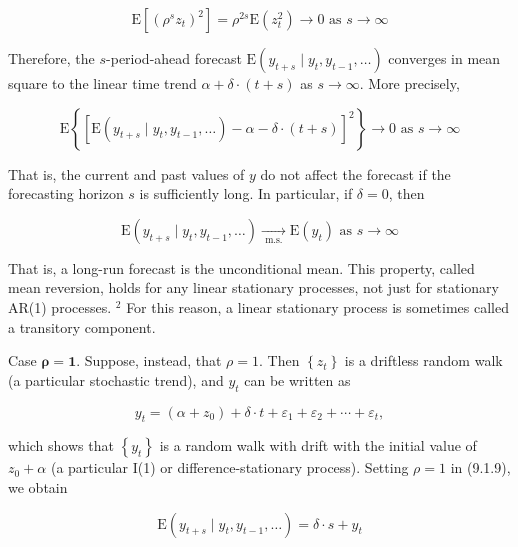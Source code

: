 \documentclass[10pt]{article}
\begin{document}
$$
\mathrm{E}\left[\left(\rho^{s} z_{t}\right)^{2}\right]=\rho^{2 s} \mathrm{E}\left(z_{t}^{2}\right) \rightarrow 0 \text { as } s \rightarrow \infty
$$

Therefore, the $s$-period-ahead forecast $\mathrm{E}\left(y_{t+s} \mid y_{t}, y_{t-1}, \ldots\right)$ converges in mean square to the linear time trend $\alpha+\delta \cdot(t+s)$ as $s \rightarrow \infty$. More precisely,


\begin{equation*}
\mathrm{E}\left\{\left[\mathrm{E}\left(y_{t+s} \mid y_{t}, y_{t-1}, \ldots\right)-\alpha-\delta \cdot(t+s)\right]^{2}\right\} \rightarrow 0 \text { as } s \rightarrow \infty \tag{9.1.10}
\end{equation*}


That is, the current and past values of $y$ do not affect the forecast if the forecasting horizon $s$ is sufficiently long. In particular, if $\delta=0$, then


\begin{equation*}
\mathrm{E}\left(y_{t+s} \mid y_{t}, y_{t-1}, \ldots\right) \underset{\text { m.s. }}{\rightarrow} \mathrm{E}\left(y_{t}\right) \text { as } s \rightarrow \infty \tag{9.1.11}
\end{equation*}


That is, a long-run forecast is the unconditional mean. This property, called mean reversion, holds for any linear stationary processes, not just for stationary AR(1) processes. ${ }^{2}$ For this reason, a linear stationary process is sometimes called a transitory component.

Case $\boldsymbol{\rho} \boldsymbol{=} \mathbf{1}$. Suppose, instead, that $\rho=1$. Then $\left\{z_{t}\right\}$ is a driftless random walk (a particular stochastic trend), and $y_{t}$ can be written as


\begin{equation*}
y_{t}=\left(\alpha+z_{0}\right)+\delta \cdot t+\varepsilon_{1}+\varepsilon_{2}+\cdots+\varepsilon_{t}, \tag{9.1.12}
\end{equation*}


which shows that $\left\{y_{t}\right\}$ is a random walk with drift with the initial value of $z_{0}+\alpha$ (a particular I(1) or difference-stationary process). Setting $\rho=1$ in (9.1.9), we obtain


\begin{equation*}
\mathrm{E}\left(y_{t+s} \mid y_{t}, y_{t-1}, \ldots\right)=\delta \cdot s+y_{t} \tag{9.1.13}
\end{equation*}
\end{document}
